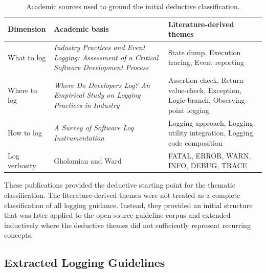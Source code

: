 \begin{table}[H]
    \centering

    \begin{tabularx}{\textwidth}{p{3.0cm} X X}
        \toprule
        \textbf{Dimension} &
        \textbf{Academic basis} &
        \textbf{Literature-derived themes} \\
        \midrule

        What to log &
        \textit{Industry Practices and Event Logging: Assessment of a Critical
        Software Development Process}~
        \cite{peccia2015industrypracticesandeventlogging} &
        State dump, Execution tracing, Event reporting \\

        Where to log &
        \textit{Where Do Developers Log? An Empirical Study on Logging Practices
        in Industry}~
        \cite{fu2014wheredodeveloperslog} &
        Assertion-check, Return-value-check, Exception, Logic-branch,
        Observing-point logging \\

        How to log &
        \textit{A Survey of Software Log Instrumentation}~
        \cite{chen2021asurveyofsoftwareloginstrumentation} &
        Logging approach, Logging utility integration, Logging code composition \\

        Log verbosity &
        Gholamian and Ward~
        \cite{gholamian2021whatdistributedsystemssay} &
        FATAL, ERROR, WARN, INFO, DEBUG, TRACE \\

        \bottomrule
    \end{tabularx}

    \caption{Academic sources used to ground the initial deductive classification.}
    \label{tab:literature-codebook-sources}
\end{table}

These publications provided the deductive starting point for the thematic
classification. The literature-derived themes were not treated as a complete
classification of all logging guidance. Instead, they provided an initial structure
that was later applied to the open-source guideline corpus and extended inductively
where the deductive themes did not sufficiently represent recurring concepts.


\subsection{Extracted Logging Guidelines}

